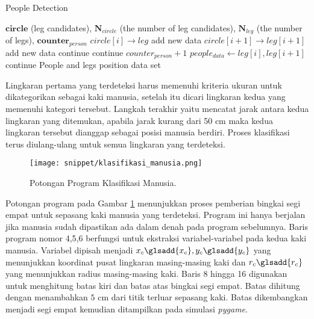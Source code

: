 \begin{algorithm}[H]
    \caption{People Detection} 
    \label{algo:deteksi}
    \begin{algorithmic}[1]
        \Require $\textbf{circle}$ (leg candidates), $\textbf{N}_{circle}$ (the number of leg candidates), $\textbf{N}_{leg}$ (the number of legs), $\textbf{counter}_{person}$
                        \State $circle[i] \to leg$ add new data
                        \State $circle[i+1] \to leg[i+1]$ add new data
                    \Else
                        \State continue
                    \EndIf
            \Else
                \State continue
            \EndIf
        \EndFor
                \State $counter_{person}+1$
                \State $people_{data} \gets leg[i],leg[i+1]$
                \Else
                \State continue
                \EndIf
        \EndFor
    \State \Return People and legs position data set
    \end{algorithmic}
\end{algorithm}

Lingkaran pertama yang terdeteksi harus memenuhi kriteria ukuran untuk dikategorikan sebagai kaki manusia, setelah itu dicari lingkaran kedua yang memenuhi kategori tersebut. Langkah terakhir yaitu mencatat jarak antara kedua lingkaran yang ditemukan, apabila jarak kurang dari 50 cm maka kedua lingkaran tersebut dianggap sebagai posisi manusia berdiri. Proses klasifikasi terus diulang-ulang untuk semua lingkaran yang terdeteksi.

\begin{figure}[H]
    \centering
    \texttt{[image: snippet/klasifikasi\_manusia.png]}
    \caption{Potongan Program Klasifikasi Manusia.}
    \label{fig:Ch04_klasifikasi_manusia}
\end{figure}

Potongan program pada Gambar \ref*{fig:Ch04_klasifikasi_manusia} menunjukkan proses pemberian bingkai  segi empat untuk sepasang kaki manusia yang terdeteksi. Program ini hanya berjalan jika manusia sudah dipastikan ada dalam denah pada program sebelumnya. Baris program nomor 4,5,6 berfungsi untuk ekstraksi variabel-variabel pada kedua kaki manusia. Variabel dipisah menjadi $x_c\glsadd{x_c},y_c\glsadd{y_c}$ yang menunjukkan koordinat pusat lingkaran masing-masing kaki dan $r_c\glsadd{r_c}$ yang menunjukkan radius masing-masing kaki. Baris 8 hingga 16 digunakan untuk menghitung batas kiri dan batas atas bingkai segi empat. Batas dihitung dengan menambahkan $5$ cm dari titik terluar sepasang kaki. Batas dikembangkan menjadi segi empat kemudian ditampilkan pada simulasi \textit{pygame}.

